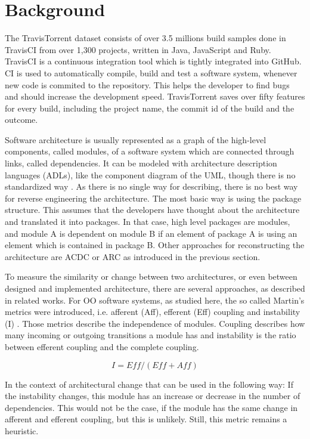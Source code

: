 \documentclass[conference]{IEEEtran}
\begin{document}
\section{Background}

The TravisTorrent dataset \cite{TravisTorrent} consists of over 3.5 millions build samples done in TravisCI from over 1,300 projects, written in Java, JavaScript and Ruby. TravisCI is a continuous integration tool which is tightly integrated into GitHub. CI is used to automatically compile, build and test a software system, whenever new code is commited to the repository. This helps the developer to find bugs and should increase the development speed. 
TravisTorrent saves over fifty features for every build, including the project name, the commit id of the build and the outcome.

Software architecture is usually represented as a graph of the high-level components, called modules, of a software system which are connected through links, called dependencies. It can be modeled with architecture description languages (ADLs), like the component diagram of the UML, though there is no standardized way \cite{UML-Arch}. 
As there is no single way for describing, there is no best way for reverse engineering the architecture. The most basic way is using the package structure. This assumes that the developers have thought about the architecture and translated it into packages. In that case, high level packages are modules, and module A is dependent on module B if an element of package A is using an element which is contained in package B.
Other approaches for reconstructing the architecture are ACDC or ARC as introduced in the previous section.

To measure the similarity or change between two architectures, or even between designed and implemented architecture, there are several approaches, as described in related works. For OO software systems, as studied here, the so called Martin's metrics \cite{martinsMetrics} were introduced, i.e. afferent (Aff), efferent (Eff) coupling and instability (I) . Those metrics describe the independence of modules. Coupling describes how many incoming or outgoing transitions a module has and instability is the ratio between efferent coupling and the complete coupling. 

\begin{equation} \label{eq:inst}
I = \textit{Eff} / (\textit{Eff} + \textit{Aff})
\end{equation}

In the context of architectural change that can be used in the following way: If the instability changes, this module has an increase or decrease in the number of dependencies. This would not be the case, if the module has the same change in afferent and efferent coupling, but this is unlikely. Still, this metric remains a heuristic.
\end{document}

